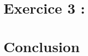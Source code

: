 \documentclass[a4paper, 10pt]{article}
\begin{document}
\section*{Exercice 3 :}

\subsection*{}
\subsection*{}
\subsection*{}

\section*{Conclusion}
\end{document}
